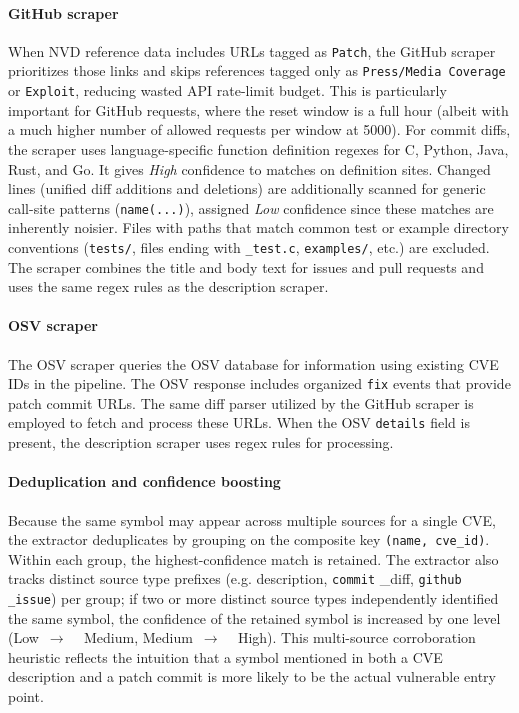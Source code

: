 \documentclass[conference]{IEEEtran}
\begin{document}
\paragraph{GitHub scraper}
When NVD reference data includes URLs tagged as \texttt{Patch}, the GitHub scraper prioritizes those links and skips references tagged only as \texttt{Press/Media~Coverage} or \texttt{Exploit}, reducing wasted API rate-limit budget.
This is particularly important for GitHub requests, where the reset window is a full hour (albeit with a much higher number of allowed requests per window at 5000)\cite{github_rate_limits}.
For commit diffs, the scraper uses language-specific function definition regexes for C, Python, Java, Rust, and Go.
It gives \textit{High} confidence to matches on definition sites.
Changed lines (unified diff additions and deletions) are additionally scanned for generic call-site patterns (\texttt{name(...)}), assigned \textit{Low} confidence since these matches are inherently noisier.
Files with paths that match common test or example directory conventions (\texttt{tests/}, files ending with \texttt{\_test.c}, \texttt{examples/}, etc.) are excluded.
The scraper combines the title and body text for issues and pull requests and uses the same regex rules as the description scraper.

\paragraph{OSV scraper}
The OSV scraper queries the OSV database for information using existing CVE IDs in the pipeline.
The OSV response includes organized \texttt{fix} events that provide patch commit URLs.
The same diff parser utilized by the GitHub scraper is employed to fetch and process these URLs.
When the OSV \texttt{details} field is present, the description scraper uses regex rules for processing.

\paragraph{Deduplication and confidence boosting}
Because the same symbol may appear across multiple sources for a single CVE, the extractor deduplicates by grouping on the composite key \texttt{(name, cve\_id)}.
Within each group, the highest-confidence match is retained.
The extractor also tracks distinct source type prefixes (e.g. description, \texttt{commit} \_diff, \texttt{github} \texttt{\_issue}) per group; if two or more distinct source types independently identified the same symbol, the confidence of the retained symbol is increased by one level (Low~$\to$ ~ Medium, Medium~$\to$ ~ High).
This multi-source corroboration heuristic reflects the intuition that a symbol mentioned in both a CVE description and a patch commit is more likely to be the actual vulnerable entry point.
\end{document}
